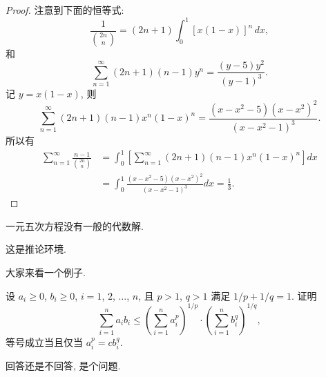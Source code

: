 \begin{proof}
    注意到下面的恒等式:
    \[
        \frac{1}{\binom{2n}{n}}=(2n+1)\int_0^1[x(1-x)]^n\,dx,
    \]
    和
    \[
        \sum_{n=1}^{\infty}(2n+1)(n-1)y^n=\frac{(y-5)y^2}{(y-1)^3}.
    \]
    记 $y=x(1-x)$, 则
    \[
        \sum_{n=1}^{\infty}(2n+1)(n-1)x^n(1-x)^n=\frac{(x-x^2-5)(x-x^2)^2}{(x-x^2-1)^3}.
    \]
    所以有
    \begin{align*}
        \sum_{n=1}^{\infty}\frac{n-1}{\binom{2n}{n}} & =
        \int_0^1\left[\sum_{n=1}^{\infty}(2n+1)(n-1)x^n(1-x)^n\right]dx                                           \\
                                                     & =\int_0^1\frac{(x-x^2-5)(x-x^2)^2}{(x-x^2-1)^3}dx=\frac13.
    \end{align*}
\end{proof}

\begin{theorem}\label{the:theorem1}
    一元五次方程没有一般的代数解.
\end{theorem}

\begin{corollary}
    这是推论环境.
\end{corollary}

\begin{example}
    大家来看一个例子.
\end{example}

\begin{exercise}
    设 $a_i\geq0$, $b_i\geq0$, $i=1$, $2$, $\ldots$, $n$,
    且 $p>1$, $q>1$ 满足 $1/p+1/q=1$. 证明
    \[
        \sum_{i=1}^{n}a_ib_i\leq\left(\sum_{i=1}^{n}a_i^p\right)^{1/p}
        \cdot\left(\sum_{i=1}^{n}b_i^q\right)^{1/q},
    \]
    等号成立当且仅当 $a_i^p=cb_i^q$.
\end{exercise}

\begin{problem}
回答还是不回答, 是个问题.
\end{problem}